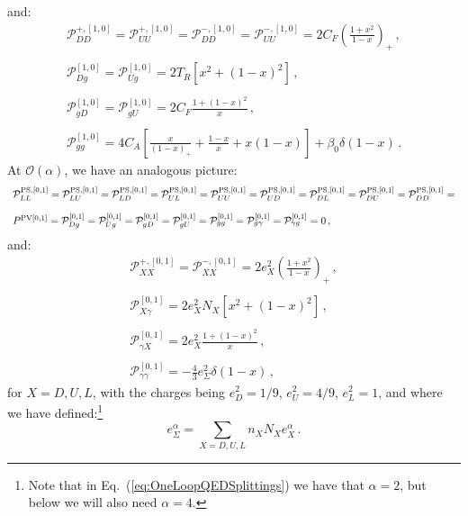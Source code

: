 \documentclass[10pt,a4paper]{article}
\begin{document}
and:
\begin{equation}
\begin{array}{l}
\displaystyle
  \mathcal{P}_{DD}^{+,[1,0]}=\mathcal{P}_{UU}^{+,[1,0]}=\mathcal{P}_{DD}^{-,[1,0]}=\mathcal{P}_{UU}^{-,[1,0]}
  = 2C_F\left(\frac{1+x^2}{1-x}\right)_+\,,\\
\\
\displaystyle \mathcal{P}_{Dg}^{[1,0]}=\mathcal{P}_{Ug}^{[1,0]}=2T_R\left[x^2+(1-x)^2\right]\,,\\
\\
\displaystyle \mathcal{P}_{gD}^{[1,0]}=\mathcal{P}_{gU}^{[1,0]}=2C_F\frac{1+(1-x)^2}{x}\,,\\
\\
\displaystyle \mathcal{P}_{gg}^{[1,0]}=4C_A\left[\frac{x}{(1-x)_+}+\frac{1-x}{x}+x(1-x)\right]+\beta_0\delta(1-x)\,.
\end{array}
\end{equation}
At $\mathcal{O}(\alpha)$, we have an analogous picture:
\begin{equation}
\begin{array}{l}
\mathcal{P}^{\rm PS,[0,1]}_{LL}=\mathcal{P}^{\rm
  PS,[0,1]}_{LU}=\mathcal{P}^{\rm PS,[0,1]}_{LD}=\mathcal{P}^{\rm
  PS,[0,1]}_{UL}=\mathcal{P}^{\rm PS,[0,1]}_{UU}=\mathcal{P}^{\rm
  PS,[0,1]}_{UD}=\mathcal{P}^{\rm
  PS,[0,1]}_{DL}=\mathcal{P}^{\rm PS,[0,1]}_{DU}=\mathcal{P}^{\rm
  PS,[0,1]}_{DD}=\\
\\
  P^{\rm PV [0,1]}=\mathcal{P}_{Dg}^{[0,1]}=\mathcal{P}_{Ug}^{[0,1]}=\mathcal{P}_{gD}^{[0,1]}=\mathcal{P}_{gU}^{[0,1]}=\mathcal{P}_{gg}^{[0,1]}=\mathcal{P}_{g\gamma}^{[0,1]}=\mathcal{P}_{\gamma g}^{[0,1]}=0\,,
\end{array}
\end{equation}
and:
\begin{equation}
\begin{array}{l}
\displaystyle
  \mathcal{P}_{XX}^{+,[0,1]}=\mathcal{P}_{XX}^{-,[0,1]} = 2e_X^2\left(\frac{1+x^2}{1-x}\right)_+\,,\\
\\
\displaystyle \mathcal{P}_{X\gamma}^{[0,1]}=2e_X^2N_X\left[x^2+(1-x)^2\right]\,,\\
\\
\displaystyle \mathcal{P}_{\gamma X}^{[0,1]}=2e_X^2\frac{1+(1-x)^2}{x}\,,\\
\\
\displaystyle \mathcal{P}_{\gamma\gamma}^{[0,1]}=-\frac{4}{3}e_\Sigma^2\delta(1-x)\,,
\end{array}
\label{eq:OneLoopQEDSplittings}
\end{equation}
for $X=D,U,L$, with the charges being $e_D^2=1/9$, $e_U^2=4/9$,
$e_L^2=1$, and where we have defined:\footnote{Note that in
  Eq.~(\ref{eq:OneLoopQEDSplittings}) we have that $\alpha=2$, but
  below we will also need $\alpha=4$.}
\begin{equation}
  e_\Sigma^\alpha=\sum_{X=D,U,L}n_XN_Xe_X^\alpha\,.
\end{equation}
\end{document}
